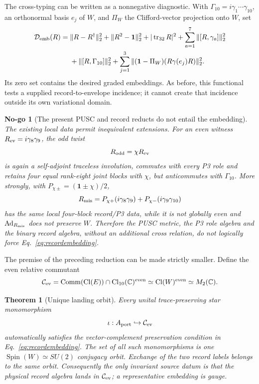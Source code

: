 \documentclass[11pt,a4paper]{article}
\newtheorem{theorem}[definition]{Theorem}
\newtheorem{nogo}[definition]{No-go}
\theoremstyle{remark}
\newcommand{\id}{\mathbf 1}
\begin{document}
The cross-typing can be written as a nonnegative diagnostic.  With
$\Gamma_{10}=i\gamma_1\cdots\gamma_{10}$, an orthonormal basis $e_j$ of
$W$, and $\Pi_W$ the Clifford-vector projection onto $W$, set
\begin{align}
 \mathcal D_{\rm emb}(R)={}&
 \|R-R^\dagger\|_2^2+\|R^2-\id\|_2^2
 +|\operatorname{tr}_{32}R|^2
 +\sum_{a=1}^7\|[R,\gamma_a]\|_2^2\nonumber\\
 &+\|[R,\Gamma_{10}]\|_2^2
 +\sum_{j=1}^3
 \|(\id-\Pi_W)(R\gamma(e_j)R)\|_2^2.
 \label{eq:embeddingdefect}
\end{align}
Its zero set contains the desired graded embeddings.  As before, this
functional tests a supplied record-to-envelope incidence; it cannot create
that incidence outside its own variational domain.

\begin{nogo}[The present PUSC and record reducts do not entail the embedding]
The existing local data permit inequivalent extensions.  For an even witness
$R_{\rm ev}=i\gamma_8\gamma_9$, the odd twist
\begin{equation}
 R_{\rm odd}=\chi R_{\rm ev}
 \label{eq:oddtwist}
\end{equation}
is again a self-adjoint traceless involution, commutes with every P3 role and
retains four equal rank-eight joint blocks with $\chi$, but anticommutes with
$\Gamma_{10}$.  More strongly, with
$P_{\chi\pm}=(\id\pm\chi)/2$,
\begin{equation}
 R_{\rm mis}=P_{\chi+}(i\gamma_8\gamma_9)
 +P_{\chi-}(i\gamma_9\gamma_{10})
 \label{eq:misalignedrecord}
\end{equation}
has the same local four-block record/P3 data, while it is not globally even
and $\operatorname{Ad}_{R_{\rm mis}}$ does not preserve $W$.  Therefore the
PUSC metric, the P3 role algebra and the binary record algebra, without an
additional cross relation, do not logically force
Eq.~\eqref{eq:recordembedding}.
\end{nogo}

The premise of the preceding reduction can be made strictly smaller.  Define
the even relative commutant
\begin{equation}
 \mathcal C_{\rm ev}
 =\operatorname{Comm}(\operatorname{Cl}(E))
  \cap \operatorname{Cl}_{10}(\mathbb C)^{\rm even}
 \simeq \operatorname{Cl}(W)^{\rm even}
 \simeq M_2(\mathbb C).
 \label{eq:evencommutant}
\end{equation}

\begin{theorem}[Unique landing orbit]
Every unital trace-preserving star monomorphism
\begin{equation}
 \iota:A_{\rm port}\hookrightarrow\mathcal C_{\rm ev}
 \label{eq:minimallanding}
\end{equation}
automatically satisfies the vector-complement preservation condition in
Eq.~\eqref{eq:recordembedding}.  The set of all such monomorphisms is one
$\operatorname{Spin}(W)\simeq SU(2)$ conjugacy orbit.  Exchange of the two
record labels belongs to the same orbit.  Consequently the only invariant
source datum is that the physical record algebra lands in
$\mathcal C_{\rm ev}$; a representative embedding is gauge.
\end{theorem}
\end{document}
